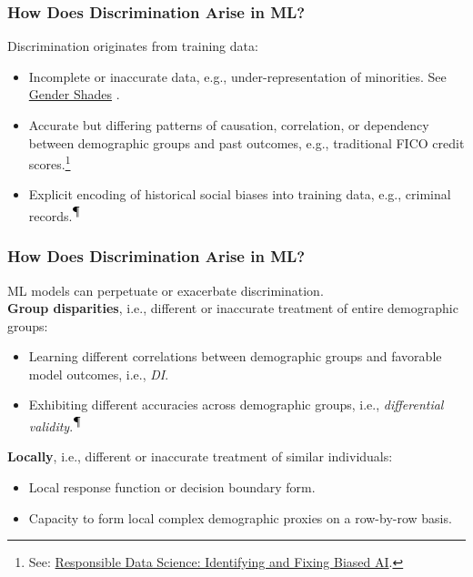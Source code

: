 \documentclass[11pt,aspectratio=169,hyperref={colorlinks}]{beamer}
\begin{document}
		\begin{frame}				
		
			\frametitle{How Does Discrimination Arise in ML?}
			
			\noindent Discrimination originates from training data:\\
			\begin{itemize}
				\item Incomplete or inaccurate data, e.g., under-representation of minorities. See \href{http://gendershades.org/}{Gender Shades} \cite{gender_shades}.
				\item Accurate but differing patterns of causation, correlation, or dependency between demographic groups and past outcomes, e.g., traditional FICO credit scores.\footnote{\scriptsize{See: \href{https://www.youtube.com/watch?v=rToFuhI6Nlw}{Responsible Data Science: Identifying and Fixing Biased AI}.}}
				\item Explicit encoding of historical social biases into training data, e.g., criminal records.\textsuperscript{$\mathparagraph$}
			\end{itemize}

		\end{frame}

		\begin{frame}				
		
			\frametitle{How Does Discrimination Arise in ML?}
			
			ML models can perpetuate or exacerbate discrimination.\\
			\vspace{10pt}
			\noindent \textbf{Group disparities}, i.e., different or inaccurate treatment of entire demographic groups:\\
			\begin{itemize}
				\item Learning different correlations between demographic groups and favorable model outcomes, i.e., \textit{DI}.
				\item Exhibiting different accuracies across demographic groups, i.e., \textit{differential validity}.\textsuperscript{$\mathparagraph$}
			\end{itemize}
			\vspace{5pt}
			\noindent \textbf{Locally}, i.e., different or inaccurate treatment of similar individuals:\\
			\begin{itemize}
				\item Local response function or decision boundary form. 
				\item Capacity to form local complex demographic proxies on a row-by-row basis.
			\end{itemize}
							
		\end{frame}
\end{document}
